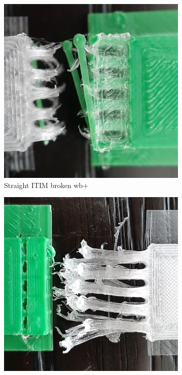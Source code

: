 \begin{figure}
\begin{subfigure}[B]{.99\columnwidth}
		\includegraphics[width=\figwidth]{sources-testing-j5_cropped.jpg}
		\caption{Straight ITIM broken wb+}
		\label{interlocking:fig:failures_straight}
	\end{subfigure}
	\setlength{\figheight}{.25\columnwidth}
	\begin{subfigure}[B]{.28\columnwidth}
		\centering
		\includegraphics[height=\figheight]{sources-testing-a1_cropped.jpg}

\end{subfigure}
\end{figure}
